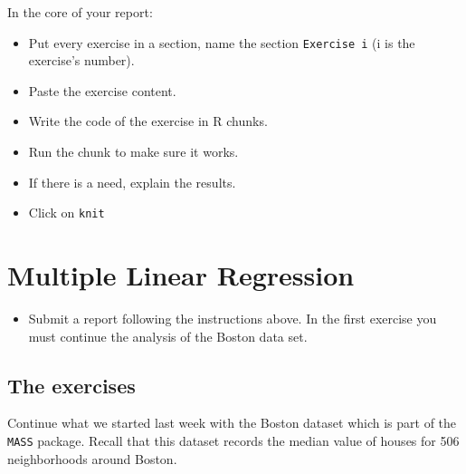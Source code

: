 \documentclass[]{book}
\providecommand{\tightlist}{%
  \setlength{\itemsep}{0pt}\setlength{\parskip}{0pt}}
\newenvironment{rmdblock}[1]
  {\begin{shaded*}
  \begin{itemize}
  \renewcommand{\labelitemi}{
    \raisebox{-.7\height}[0pt][0pt]{
      {\setkeys{Gin}{width=2em,keepaspectratio}\texttt{[image: img/icons/\#1]}}
    }
  }
  \item
  }
  {
  \end{itemize}
  \end{shaded*}
  }
\newenvironment{rmdexercise}
  {\begin{rmdblock}{exercise}}
  {\end{rmdblock}}
\begin{document}
In the core of your report:

\begin{itemize}
\tightlist
\item
  Put every exercise in a section, name the section \texttt{Exercise\ i}
  (i is the exercise's number).
\item
  Paste the exercise content.
\item
  Write the code of the exercise in R chunks.
\item
  Run the chunk to make sure it works.
\item
  If there is a need, explain the results.
\item
  Click on \texttt{knit}
\end{itemize}

\section{Multiple Linear Regression}\label{multiple-linear-regression-1}

\begin{rmdexercise}
Submit a report following the instructions above. In the first exercise
you must continue the analysis of the Boston data set.
\end{rmdexercise}

\subsection*{The exercises}\label{the-exercises}

Continue what we started last week with the Boston dataset which is part
of the \texttt{MASS} package. Recall that this dataset records the
median value of houses for 506 neighborhoods around Boston.
\end{document}
